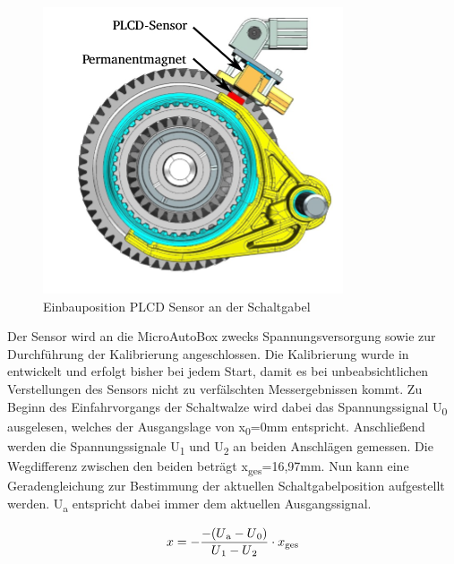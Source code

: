 \begin{figure}[h]
	\centering
		\includegraphics{Bilder/Sensor.png}
	\caption{Einbauposition PLCD Sensor an der Schaltgabel \cite[S.14]{adp}}
	\label{fig:Sensor}
\end{figure}
Der Sensor wird an die MicroAutoBox zwecks Spannungsversorgung sowie zur Durchführung der Kalibrierung angeschlossen. Die Kalibrierung wurde in \cite[S.24f]{messtechnik} entwickelt und erfolgt bisher bei jedem Start, damit es bei unbeabsichtlichen Verstellungen des Sensors nicht zu verfälschten Messergebnissen kommt. Zu Beginn des Einfahrvorgangs der Schaltwalze wird dabei das Spannungssignal U\textsubscript{0} ausgelesen, welches der Ausgangslage von x\textsubscript{0}=0mm entspricht. Anschließend werden die Spannungssignale U\textsubscript{1} und U\textsubscript{2} an beiden Anschlägen gemessen. Die Wegdifferenz zwischen den beiden beträgt x\textsubscript{ges}=16,97mm. Nun kann eine Geradengleichung zur Bestimmung der aktuellen Schaltgabelposition aufgestellt werden. U\textsubscript{a} entspricht dabei immer dem aktuellen Ausgangssignal.

\begin{equation}
	x=-\frac{-(U\textsubscript{a} -U\textsubscript{0})}{U\textsubscript{1}-U\textsubscript{2}}\cdot x\textsubscript{ges}
\end{equation}
 

